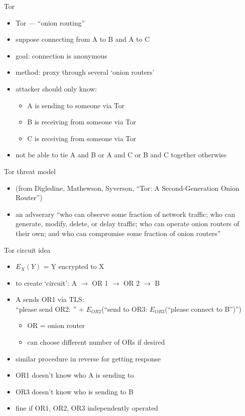 \begin{frame}{Tor}
    \begin{itemize}
    \item Tor --- ``onion routing''
    \item suppose connecting from A to B and A to C
    \item goal: connection is anonymous
    \item method: proxy through several `onion routers'
    \vspace{.5cm}
    \item attacker should only know:
        \begin{itemize}
        \item A is sending to someone via Tor
        \item B is receiving from someone via Tor
        \item C is receiving from someone via Tor
        \end{itemize}
    \item not be able to tie A and B or A and C or B and C together otherwise
    \end{itemize}
\end{frame}

\begin{frame}{Tor threat model}
    \begin{itemize}
    \item (from Digledine, Mathewson, Syverson, ``Tor: A Second-Generation Onion Router'')
    \item an advserary ``who can observe some fraction of network traffic; who can generate, modify,
        delete, or delay traffic; who can operate onion routers of their own; and who can compromise some
        fraction of onion routers''
    \end{itemize}
\end{frame}

\begin{frame}{Tor circuit idea}
    \begin{itemize}
    \item $E_X(Y)$ = Y encrypted to X
    \item to create `circuit': A $\rightarrow$ OR 1 $\rightarrow$ OR 2 $\rightarrow$ B
    \item A sends OR1 via TLS: \\
        ``please send OR2: '' + $E_{OR2}$(``send to OR3: $E_{OR3}$(``please connect to B'')'')
        \begin{itemize}
        \item OR = onion router
        \item can choose different number of ORs if desired
        \end{itemize}
    \item similar procedure in reverse for getting response
    \vspace{.5cm}
    \item OR1 doesn't know who A is sending to
    \item OR3 doesn't know who is sending to B
    \item fine if OR1, OR2, OR3 independently operated
    \end{itemize}
\end{frame}

